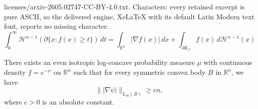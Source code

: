 \documentclass[10pt,a4paper]{amsart}
\newcommand{\R}{\mathbb{R}}
\newcommand{\gr}{\geqslant}
\begin{document}
licenses/arxiv-2605.02747-CC-BY-4.0.txt. Characters: every retained excerpt is pure ASCII, so the delivered engine, XeLaTeX with its default Latin Modern text font, reports no missing character.
\begin{equation} \label{eq:gen-coarea}
\int_{0}^{\infty} \mathcal H^{n-1}(\partial\{x:f(x)\gr t\})\,dt=\int_{\mathbb{R}^n}|\nabla f(x)|\,dx+\int_{\partial K_f}f(x)\,d\mathcal{H}^{n-1}(x)
\end{equation}

\begin{proposition}\label{prop:lower-sup}There exists an even isotropic log-concave probability measure $\mu$ with continuous density $f=e^{-\psi}$ on $\mathbb{R}^n$ such that for every symmetric convex body $B$ in $\R^n$, we have
$$\big\||\nabla \psi|\big\|_{L_\infty(B)}\gr cn,$$
where $c>0$ is an absolute constant.
\end{proposition}
\end{document}
